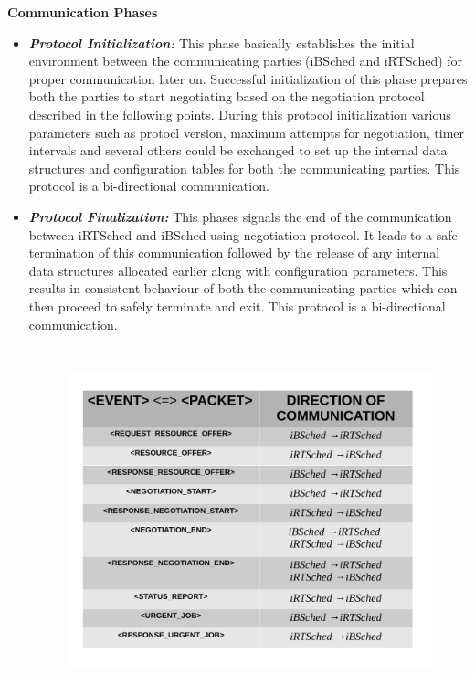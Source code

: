 \textbf{Communication Phases}
\begin{itemize}
\item \textbf{\textit{Protocol Initialization:}} This phase basically establishes the initial environment between the communicating parties (iBSched and iRTSched) for proper communication later on. Successful initialization of this phase prepares both the parties to start negotiating based on the negotiation protocol described in the following points. During this protocol initialization various parameters such as protocl version, maximum attempts for negotiation, timer intervals and several others could be exchanged to set up the internal data structures and configuration tables for both the communicating parties. This protocol is a bi-directional communication.
\item \textbf{\textit{Protocol Finalization:}} This phases signals the end of the communication between iRTSched and iBSched using negotiation protocol. It leads to a safe termination of this communication followed by the release of any internal data structures allocated earlier along with configuration parameters. This results in consistent behaviour of both the communicating parties which can then proceed to safely terminate and exit. This protocol is a bi-directional communication.
\begin{figure}[h]
\centering
\includegraphics[width=1.0\textwidth, height=100mm]{./figures/table.pdf}

\end{figure}
\end{itemize}
